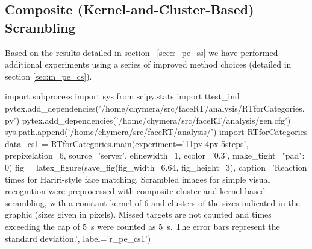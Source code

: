 	\subsection{Composite (Kernel-and-Cluster-Based) Scrambling}\label{sec:r_pe_cs}
	    Based on the results detailed in section ~\ref{sec:r_pe_ss} we have performed additional experiments using a series of improved method choices (detailed in section \ref{sec:m_pe_cs}).
	    \begin{pycode}
		import subprocess
		import sys
		from scipy.stats import ttest_ind
		pytex.add_dependencies('/home/chymera/src/faceRT/analysis/RTforCategories.py')
		pytex.add_dependencies('/home/chymera/src/faceRT/analysis/gen.cfg')
		sys.path.append('/home/chymera/src/faceRT/analysis/')
		import RTforCategories
		data_cs1 = RTforCategories.main(experiment='11px-4px-5steps', prepixelation=6, source='server', elinewidth=1, ecolor='0.3', make_tight={"pad": 0})
		fig = latex_figure(save_fig(fig_width=6.64, fig_height=3), caption='Reaction times for Hariri-style face matching. Scrambled images for simple visual recognition were preprocessed with composite cluster and kernel based scrambling, with a constant kernel of \SI{6}{\pixel} and clusters of the sizes indicated in the graphic (sizes given in pixels). Missed targets are not counted and times exceeding the cap of \SI{5}{\second} were counted as \SI{5}{\second}. The error bars represent the standard deviation.', label='r_pe_cs1')
	    \end{pycode}
	    
